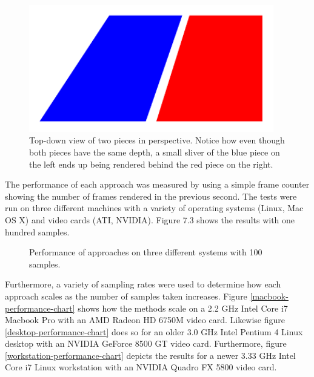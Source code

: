 \documentclass{report}
\begin{document}
\begin{figure}
\centering
\includegraphics[width=0.95\textwidth]{pieces-in-perspective.pdf}
\caption{Top-down view of two pieces in perspective.  Notice how even though
both pieces have the same depth, a small sliver of the blue piece on the left
ends up being rendered behind the red piece on the right.}
\label{pieces-in-perspective}
\end{figure}

The performance of each approach was measured by using a simple frame counter
showing the number of frames rendered in the previous second.  The tests were
run on three different machines with a variety of operating systems (Linux, Mac
OS X) and video cards (ATI, NVIDIA).  Figure 7.3 shows the results with one
hundred samples.

\begin{figure}
\label{overall-performance-chart}
\centering
{}
\caption{Performance of approaches on three different systems with 100 samples.}
\end{figure}

Furthermore, a variety of sampling rates were used to determine how each
approach scales as the number of samples taken increases.  Figure
\ref{macbook-performance-chart} shows how the methods scale on a 2.2 GHz Intel
Core i7 Macbook Pro with an AMD Radeon HD 6750M video card.  Likewise figure
\ref{desktop-performance-chart} does so for an older 3.0 GHz Intel Pentium 4
Linux desktop with an NVIDIA GeForce 8500 GT video card.  Furthermore, figure
\ref{workstation-performance-chart} depicts the results for a newer 3.33 GHz
Intel Core i7 Linux workstation with an NVIDIA Quadro FX 5800 video card.
\end{document}
